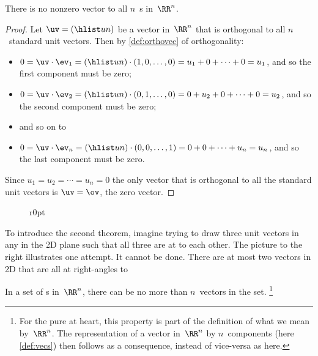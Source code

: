 \begin{theorem} \label{thm:nononz}
There is no nonzero vector  to all \(n\)~s in~\(\RR^n\).
\end{theorem}

\begin{proof} 
Let \(\uv=(\hlist un)\) be a vector in~\(\RR^n\) that is orthogonal to all \(n\)~standard unit vectors.  
Then by \cref{def:orthovec} of orthogonality:
\begin{itemize}
\item \(0=\uv\cdot\ev_1=(\hlist un)\cdot(1,0,\ldots,0)=u_1+0+\cdots+0=u_1\), and so the first component must be zero;
\item \(0=\uv\cdot\ev_2=(\hlist un)\cdot(0,1,\ldots,0)=0+u_2+0+\cdots+0=u_2\), and so the second component must be zero; 
\item and so on to
\item \(0=\uv\cdot\ev_n=(\hlist un)\cdot(0,0,\ldots,1)=0+0+\cdots+u_n=u_n\), and so the last component must be zero.
\end{itemize}
Since \(u_1=u_2=\cdots=u_n=0\) the only vector that is orthogonal to all the standard unit vectors is \(\uv=\ov\), the zero vector.
\end{proof}

\begin{wrapfigure}r{0pt}
\end{wrapfigure}
To introduce the second theorem, imagine trying to draw three unit vectors in any  in the 2D plane such that all three are at  to each other.
The picture to the right illustrates one attempt.
It cannot be done.
There are at most two vectors in 2D that are all at right-angles to 


\begin{theorem} \label{thm:orthcomp}
In a set of  s in~\(\RR^n\), there can be no more than \(n\)~vectors in the set.
\footnote{For the pure at heart, this property is part of the definition of what we mean by~\(\RR^n\).  
The representation of a vector in~\(\RR^n\) by \(n\)~components (here \cref{def:vecs}) then follows as a consequence, instead of vice-versa as here.}
\end{theorem}


